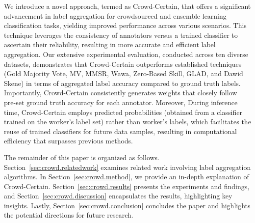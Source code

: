 We introduce a novel approach, termed as Crowd-Certain, that offers a significant advancement in label aggregation for crowdsourced and ensemble learning classification tasks, yielding improved performance across various scenarios. This technique leverages the consistency of annotators versus a trained classifier to ascertain their reliability, resulting in more accurate and efficient label aggregation.
Our extensive experimental evaluation, conducted across ten diverse datasets, demonstrates that Crowd-Certain outperforms established techniques (Gold Majority Vote, MV, MMSR, Wawa, Zero-Based Skill, GLAD, and Dawid Skene) in terms of aggregated label accuracy compared to ground truth labels. Importantly, Crowd-Certain consistently generates weights that closely follow pre-set ground truth accuracy for each annotator. Moreover, During inference time, Crowd-Certain employs predicted probabilities (obtained from a classifier trained on the worker's label set) rather than worker's labels, which facilitates the reuse of trained classifiers for future data samples, resulting in computational efficiency that surpasses previous methods.

The remainder of this paper is organized as follows. Section~\ref{sec:crowd.relatedwork} examines related work involving label aggregation algorithms. In Section~\ref{sec:crowd.method}, we provide an in-depth explanation of Crowd-Certain. Section~\ref{sec:crowd.results} presents the experiments and findings, and Section~\ref{sec:crowd.discussion} encapsulates the results, highlighting key insights. Lastly, Section~\ref{sec:crowd.conclusion} concludes the paper and highlights the potential directions for future research.


